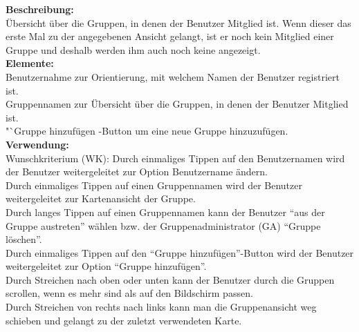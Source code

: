 

\textbf{Beschreibung:}\\
Übersicht über die Gruppen, in denen der Benutzer Mitglied ist.
Wenn dieser das erste Mal zu der angegebenen Ansicht gelangt,
ist er noch kein Mitglied einer Gruppe und deshalb werden ihm auch noch keine angezeigt.\\
\textbf{Elemente:}\\
Benutzernahme zur Orientierung, mit welchem Namen der Benutzer registriert ist.\\
Gruppennamen zur Übersicht über die Gruppen, in denen der Benutzer Mitglied ist.\\
"`Gruppe hinzufügen\grqq
-Button um eine neue Gruppe hinzuzufügen.\\
\textbf{Verwendung:}\\
Wunschkriterium (WK): Durch einmaliges Tippen auf den Benutzernamen wird der Benutzer weitergeleitet zur Option Benutzername ändern.\\
Durch einmaliges Tippen auf einen Gruppennamen wird der Benutzer weitergeleitet zur Kartenansicht der Gruppe.\\
Durch langes Tippen auf einen Gruppennamen kann der Benutzer "`aus der Gruppe austreten"' wählen bzw. der Gruppenadministrator (GA) "`Gruppe löschen"'.\\
Durch einmaliges Tippen auf den "`Gruppe hinzufügen"'-Button wird der Benutzer weitergeleitet zur Option "`Gruppe hinzufügen"'.\\
Durch Streichen nach oben oder unten kann der Benutzer durch die Gruppen scrollen, wenn es mehr sind als auf den Bildschirm passen.\\
Durch Streichen von rechts nach links kann man die Gruppenansicht weg schieben und gelangt zu der zuletzt verwendeten Karte.
\clearpage
\newpage

